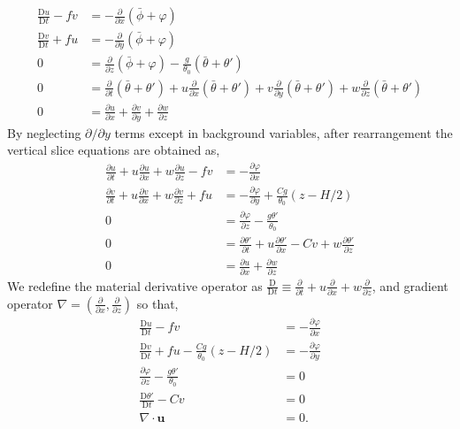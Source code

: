 \begin{equation}
	\begin{aligned}
		\frac{\mathrm{D}u}{\mathrm{D}t}	- fv  &= -\frac{\partial}{\partial x}\left(\bar{\phi} + \varphi\right)
		\\
		\frac{\mathrm{D}v}{\mathrm{D}t}	+ fu  &= -\frac{\partial}{\partial y}\left(\bar{\phi} + \varphi\right)
		\\
		0 &=\frac{\partial}{\partial z}\left(\bar{\phi} + \varphi\right) - \frac{g}{\theta_0}\left(\bar{\theta} + \theta'\right)
		\\
		0 & =\frac{\partial }{\partial t}\left(\bar{\theta} + \theta'\right) +u\frac{\partial }{\partial x}\left(\bar{\theta} + \theta'\right) + v\frac{\partial }{\partial y}\left(\bar{\theta} + \theta'\right) + w\frac{\partial }{\partial z}\left(\bar{\theta} + \theta'\right)
		\\
		0 &= \frac{\partial u}{\partial x} + \frac{\partial v}{\partial y} + \frac{\partial w}{\partial z}
	\end{aligned}
\end{equation}
By neglecting $\partial/\partial y$ terms except in background variables, after rearrangement the vertical slice equations are obtained as,
\begin{equation}
	\begin{aligned}
		\frac{\partial u}{\partial t} + u\frac{\partial u}{\partial x} + w\frac{\partial u}{\partial z}	- fv  &= -\frac{\partial \varphi}{\partial x}
		\\
		\frac{\partial v}{\partial t} + u\frac{\partial v}{\partial x} + w\frac{\partial v}{\partial z}	+ fu  &= -\frac{\partial \varphi}{\partial y} + \frac{Cg}{\theta_0}\left(z - H/2\right)
		\\
		0 &=\frac{\partial \varphi}{\partial z} - \frac{g\theta'}{\theta_0}
		\\
		0 & =\frac{\partial \theta'}{\partial t} + u\frac{\partial \theta'}{\partial x} - Cv + w\frac{\partial \theta'}{\partial z}
		\\
		0 &= \frac{\partial u}{\partial x} + \frac{\partial w}{\partial z}
	\end{aligned} 
\label{VerticalSlice}
\end{equation}
We redefine the material derivative operator as $\frac{\mathrm{D} }{\mathrm{D} t} \equiv \frac{\partial  }{\partial t} + u\frac{\partial  }{\partial x} + w\frac{\partial  }{\partial z} $, and gradient operator $\nabla = \left(\frac{\partial }{\partial x}, \frac{\partial }{\partial z}\right)$ so that,
\begin{equation}
	\begin{aligned}
	\frac{\mathrm{D}u}{\mathrm{D}t}	- fv  &= -\frac{\partial \varphi}{\partial x}
	\\
	\frac{\mathrm{D}v}{\mathrm{D}t}	+ fu - \frac{Cg}{\theta_0}\left(z - H/2\right) &= -\frac{\partial \varphi}{\partial y} 
	\\
	\frac{\partial \varphi}{\partial z} - \frac{g\theta'}{\theta_0} &= 0
	\\
	\frac{\mathrm{D}\theta'}{\mathrm{D} t}  - Cv &= 0
	\\
	\nabla \cdot \bm{u} &= 0.
	\end{aligned} 
\label{VerticalSlice2}
\end{equation}
